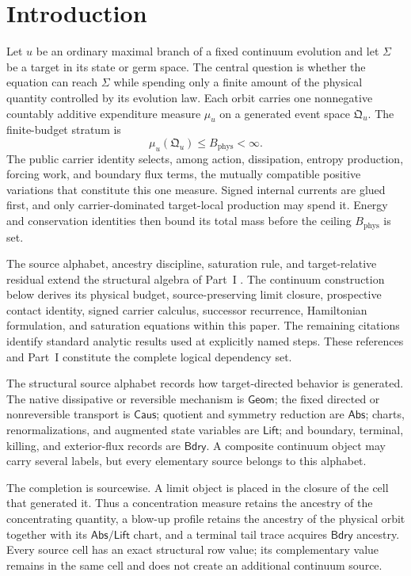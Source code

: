 \documentclass[11pt]{article}
\numberwithin{section}{part}
\theoremstyle{plain}
\theoremstyle{definition}
\theoremstyle{remark}
\newcommand{\Geom}{\mathsf{Geom}}
\newcommand{\Caus}{\mathsf{Caus}}
\newcommand{\Abs}{\mathsf{Abs}}
\newcommand{\Lift}{\mathsf{Lift}}
\newcommand{\Bdry}{\mathsf{Bdry}}
\newcommand{\Phys}{\mathrm{phys}}
\newcommand{\Budget}{B_{\Phys}}
\begin{document}
\tableofcontents

\section*{Introduction}

Let \(u\) be an ordinary maximal branch of a fixed continuum evolution and let
\(\Sigma\) be a target in its state or germ space.  The central question is
whether the equation can reach \(\Sigma\) while spending only a finite amount
of the physical quantity controlled by its evolution law.  Each orbit carries
one nonnegative countably additive expenditure measure \(\mu_u\) on a
generated event space \(\mathfrak Q_u\).  The finite-budget stratum is
\[
  \mu_u(\mathfrak Q_u)\le \Budget<\infty.
\]
The public carrier identity selects, among action, dissipation, entropy
production, forcing work, and boundary flux terms, the mutually compatible
positive variations that constitute this one measure.  Signed internal
currents are glued first, and only carrier-dominated target-local production
may spend it.  Energy and conservation identities then bound its total mass
before the ceiling \(\Budget\) is set.

The source alphabet, ancestry discipline, saturation rule, and
target-relative residual extend the structural algebra of Part~I
\citep{DuranBallesterStructuralComplexityI}.  The continuum construction
below derives its physical budget, source-preserving limit closure,
prospective contact identity, signed carrier calculus, successor recurrence,
Hamiltonian formulation, and saturation equations within this paper.  The
remaining citations identify standard analytic results used at explicitly
named steps.  These references and Part~I constitute the complete logical
dependency set.

The structural source alphabet records how target-directed behavior is
generated.  The native dissipative or reversible mechanism is \(\Geom\); the
fixed directed or nonreversible transport is \(\Caus\); quotient and symmetry
reduction are \(\Abs\); charts, renormalizations, and augmented state
variables are \(\Lift\); and boundary, terminal, killing, and exterior-flux
records are \(\Bdry\).  A composite continuum object may carry several
labels, but every elementary source belongs to this alphabet.

The completion is sourcewise.  A limit object is placed in the closure of the
cell that generated it.  Thus a concentration measure retains the ancestry of
the concentrating quantity, a blow-up profile retains the ancestry of the
physical orbit together with its \(\Abs/\Lift\) chart, and a terminal tail
trace acquires \(\Bdry\) ancestry.  Every source cell has an exact structural
row value; its complementary value remains in the same cell and does not
create an additional continuum source.
\end{document}
